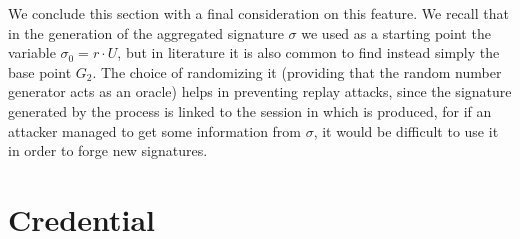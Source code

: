 \documentclass[twocolumn]{article}
\begin{document}
We conclude this section with a final consideration on this feature. We recall that in the generation of the aggregated signature $\sigma$ we used as a starting point the variable $\sigma_0 = r\cdot U$, but in literature it is also common to find instead simply the base point $G_2$. The choice of randomizing it (providing that the random number generator acts as an oracle) helps in preventing replay attacks, since the signature generated by the process is linked to the session in which is produced, for if an attacker managed to get some information from $\sigma$, it would be difficult to use it in order to forge new signatures.

\pagebreak

\section{Credential}
\label{sec:credential}
\end{document}
